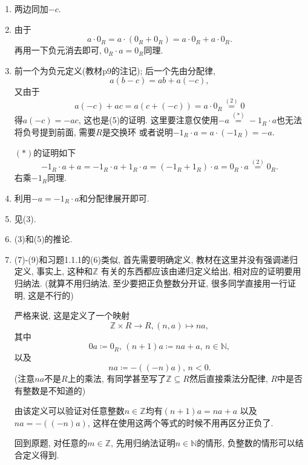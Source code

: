 \documentclass[UTF8,fontset=windows]{ctexart}
\newcommand{\defeq}{\mathrel{\coloneqq}}
\newenvironment{solution}
{\begin{tcolorbox}[colback=blue!10, colframe=blue!50, title=\textit{proof}, breakable]}
{\end{tcolorbox}}
\begin{document}
\begin{solution}
    \begin{enumerate}[(1)]
        \item 两边同加$-c$.
        \item 由于
        \[
            a \cdot 0_R = a \cdot (0_R + 0_R) = a \cdot 0_R + a \cdot 0_R.
        \]
        再用一下负元消去即可, $0_R \cdot a = 0_R$同理.
        \item 前一个为负元定义(教材p9的注记); 后一个先由分配律, 
    \[
        a(b - c) = ab + a(-c),
    \]
    又由于
    \[
        a(-c) + ac = a(c + (-c)) = a \cdot 0_R \overset{(2)}= 0
    \]
    得$a(-c) = -ac$, 这也是(5)的证明.
    这里要注意仅使用$-a \overset{(*)}= -1_R \cdot a$也无法将负号提到前面, 需要$R$是交换环
    或者说明$-1_R \cdot a = a \cdot (-1_R) = -a$.
    
    $(*)$的证明如下
    \[
        -1_R \cdot a + a = -1_R \cdot a + 1_R \cdot a = (-1_R + 1_R) \cdot a = 0_R \cdot a \overset{(2)}= 0_R.
    \]
    右乘$-1_R$同理.
        \item 利用$-a = -1_R \cdot a$和分配律展开即可.
        \item 见(3).
        \item (3)和(5)的推论.
        \item (7)-(9)和习题1.1.1的(6)类似, 首先需要明确定义,
        教材在这里并没有强调递归定义, 事实上, 这种和$\mathbb{Z}$
        有关的东西都应该由递归定义给出, 相对应的证明要用归纳法.
        (就算不用归纳法, 至少要把正负整数分开证, 很多同学直接用一行证明, 这是不行的)

        严格来说, 这是定义了一个映射
        \[
            \mathbb{Z} \times R \to R, (n, a) \mapsto na,
        \]
        其中
        \[
            0a \defeq 0_R,\, (n + 1)a \defeq na + a,\, n \in \mathbb{N},
        \]
        以及
        \[
            na \defeq -((-n)a),\, n < 0.
        \]
        (注意$na$不是$R$上的乘法, 有同学甚至写了$\mathbb{Z} \subseteq R$然后直接乘法分配律,
        $R$中是否有整数是不知道的)

        由该定义可以验证对任意整数$n \in \mathbb{Z}$均有$(n + 1)a = na + a$
        以及$na = -((-n)a)$, 这样在使用这两个等式的时候不用再区分正负了.

        回到原题, 对任意的$m \in \mathbb{Z}$, 先用归纳法证明$n \in \mathbb{N}$的情形, 
        负整数的情形可以结合定义得到.


\end{enumerate}
\end{solution}
\end{document}
